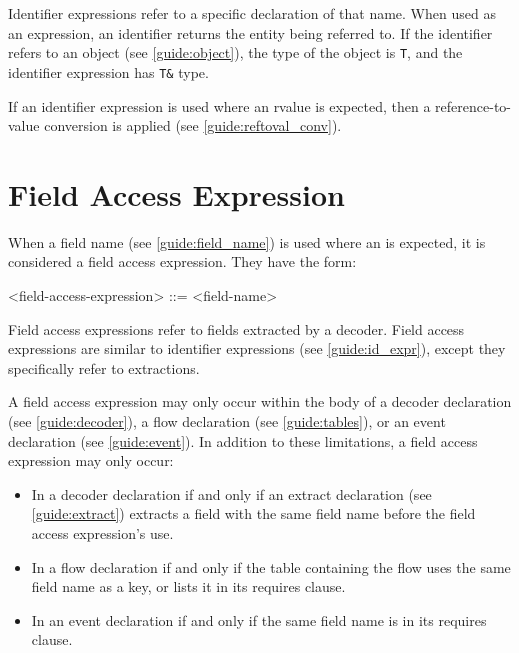 Identifier expressions refer to a specific declaration of that name. When used as an expression, an identifier returns the entity being referred to. If the identifier refers to an object (see \ref{guide:object}), the type of the object is \texttt{T}, and the identifier expression has \texttt{T\&} type. 

If an identifier expression is used where an rvalue is expected, then a reference-to-value conversion is applied (see \ref{guide:reftoval_conv}).

\section{Field Access Expression} \label{guide:field_access_expr}

When a field name (see \ref{guide:field_name}) is used where an  is expected, it is considered a field access expression. They have the form:

\begin{minip}
\begin{grammar}
<field-access-expression> ::= <field-name>
\end{grammar}
\end{minip}

Field access expressions refer to fields extracted by a decoder. Field access expressions are similar to identifier expressions (see \ref{guide:id_expr}), except they specifically refer to extractions.

A field access expression may only occur within the body of a decoder declaration (see \ref{guide:decoder}), a flow declaration (see \ref{guide:tables}), or an event declaration (see \ref{guide:event}). In addition to these limitations, a field access expression may only occur:

\begin{itemize}
\item In a decoder declaration if and only if an extract declaration (see \ref{guide:extract}) extracts a field with the same field name before the field access expression's use.

\item In a flow declaration if and only if the table containing the flow uses the same field name as a key, or lists it in its requires clause.

\item In an event declaration if and only if the same field name is in its requires clause.
\end{itemize}


